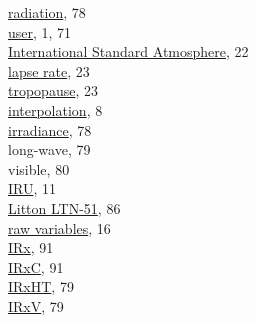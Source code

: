 \documentclass[
]{book}
\begin{document}
\hspace*{0.333em}\hspace*{0.333em}\href{./8-radiation-variables.html}{radiation}, 78\\
\hspace*{0.333em}\hspace*{0.333em}\href{./6-air-chemistry-measurements.html\#awas-cims-qcls-toga}{user}, 1, 71\\
\href{./3-the-state-of-the-aircraft.html\#palt}{International Standard Atmosphere}, 22\\
\hspace*{0.333em}\hspace*{0.333em}\href{./3-the-state-of-the-aircraft.html\#palt}{lapse rate}, 23\\
\hspace*{0.333em}\hspace*{0.333em}\href{./3-the-state-of-the-aircraft.html\#palt}{tropopause}, 23\\
\href{./2-general-information-about-data-files.html\#synchronization-of-measurements}{interpolation}, 8\\
\href{./8-radiation-measurements.html\#measurements-of-irradiance-and-radiometric-temperature}{irradiance}, 78\\
\hspace*{0.333em}\hspace*{0.333em}long-wave, 79\\
\hspace*{0.333em}\hspace*{0.333em}visible, 80\\
\href{./3-the-state-of-the-aircraft.html\#inertial-reference-systems}{IRU}, 11\\
\hspace*{0.333em}\hspace*{0.333em}\href{./10-obsolete-variables.html\#ltn51}{Litton LTN-51}, 86\\
\hspace*{0.333em}\hspace*{0.333em}\href{./3-the-state-of-the-aircraft\#special-use-irs}{raw variables}, 16\\
\href{./10-obsolete-variables.html\#irx}{IRx}, 91\\
\href{./8-radiation-variables.html\#irxc}{IRxC}, 91\\
\href{./8-radiation-variables.html\#irxht}{IRxHT}, 79\\
\href{./7-aerosol-particle-measurements.html\#trstx}{IRxV}, 79\\
\end{document}
